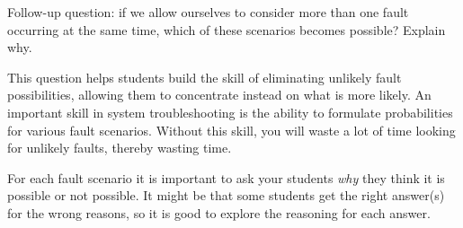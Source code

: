\vskip 10pt

Follow-up question: if we allow ourselves to consider more than one fault occurring at the same time, which of these scenarios becomes possible?  Explain why.







This question helps students build the skill of eliminating unlikely fault possibilities, allowing them to concentrate instead on what is more likely.  An important skill in system troubleshooting is the ability to formulate probabilities for various fault scenarios.  Without this skill, you will waste a lot of time looking for unlikely faults, thereby wasting time.

For each fault scenario it is important to ask your students {\it why} they think it is possible or not possible.  It might be that some students get the right answer(s) for the wrong reasons, so it is good to explore the reasoning for each answer.




